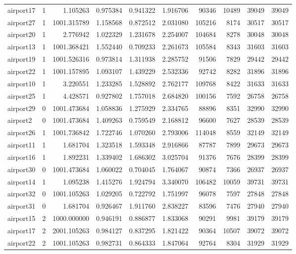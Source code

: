 \begin{longtable}{|l|r|r|r|r|r|r|r|r|r|}
airport17 & 1 & 1.105263 & 0.975384 & 0.941322 & 1.916706 & 90346 & 10489 & 39049 & 39049 \\
airport27 & 1 & 1001.315789 & 1.158568 & 0.872512 & 2.031080 & 105216 & 8174 & 30517 & 30517 \\
airport20 & 1 & 2.776942 & 1.022329 & 1.231678 & 2.254007 & 104684 & 8278 & 30048 & 30048 \\
airport13 & 1 & 1001.368421 & 1.552440 & 0.709233 & 2.261673 & 105584 & 8343 & 31603 & 31603 \\
airport19 & 1 & 1001.526316 & 0.973814 & 1.311938 & 2.285752 & 91506 & 7829 & 29442 & 29442 \\
airport22 & 1 & 1001.157895 & 1.093107 & 1.439229 & 2.532336 & 92742 & 8282 & 31896 & 31896 \\
airport10 & 1 & 3.220551 & 1.233285 & 1.528892 & 2.762177 & 109768 & 8422 & 31633 & 31633 \\
airport25 & 1 & 4.428571 & 0.927802 & 1.757018 & 2.684820 & 100156 & 7592 & 26758 & 26758 \\
airport29 & 0 & 1001.473684 & 1.058836 & 1.275929 & 2.334765 & 88896 & 8351 & 32990 & 32990 \\
airport2 & 0 & 1001.473684 & 1.409263 & 0.759549 & 2.168812 & 96600 & 7627 & 28539 & 28539 \\
airport26 & 1 & 1001.736842 & 1.722746 & 1.070260 & 2.793006 & 114048 & 8559 & 32149 & 32149 \\
airport11 & 1 & 1.681704 & 1.323518 & 1.593348 & 2.916866 & 87787 & 7899 & 29673 & 29673 \\
airport16 & 1 & 1.892231 & 1.339402 & 1.686302 & 3.025704 & 91376 & 7676 & 28399 & 28399 \\
airport30 & 0 & 1001.473684 & 1.060022 & 0.704045 & 1.764067 & 90874 & 7366 & 26937 & 26937 \\
airport14 & 1 & 1.095238 & 1.415276 & 1.924794 & 3.340070 & 106482 & 10059 & 39731 & 39731 \\
airport32 & 0 & 1001.105263 & 1.029205 & 0.722792 & 1.751997 & 96078 & 7597 & 27848 & 27848 \\
airport31 & 0 & 1.681704 & 0.926467 & 1.911760 & 2.838227 & 83596 & 7476 & 27940 & 27940 \\
airport15 & 2 & 1000.000000 & 0.946191 & 0.886877 & 1.833068 & 90291 & 9981 & 39179 & 39179 \\
airport17 & 2 & 2001.105263 & 0.984127 & 0.837295 & 1.821422 & 90364 & 10507 & 39072 & 39072 \\
airport22 & 2 & 1001.105263 & 0.982731 & 0.864333 & 1.847064 & 92764 & 8304 & 31929 & 31929 \\

\end{longtable}

